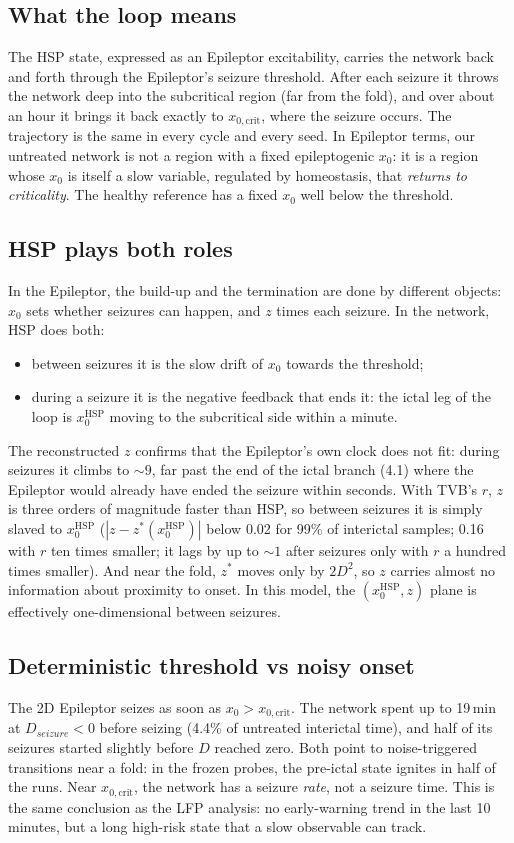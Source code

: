 \documentclass[11pt]{article}
\newcommand{\xc}{x_{0,\mathrm{crit}}}
\newcommand{\xh}{x_0^{\mathrm{HSP}}}
\begin{document}
\subsection{What the loop means}
The HSP state, expressed as an Epileptor excitability, carries the network back and forth through the Epileptor's
seizure threshold. After each seizure it throws the network deep into the subcritical region (far from the fold), and
over about an hour it brings it back exactly to $\xc$, where the seizure occurs. The trajectory is the same in every
cycle and every seed. In Epileptor terms, our untreated network is not a region with a fixed epileptogenic $x_0$:
it is a region whose $x_0$ is itself a slow variable, regulated by homeostasis, that \emph{returns to criticality}. The
healthy reference has a fixed $x_0$ well below the threshold.

\subsection{HSP plays both roles}
In the Epileptor, the build-up and the termination are done by different objects: $x_0$ sets whether seizures can
happen, and $z$ times each seizure. In the network, HSP does both:
\begin{itemize}
\item between seizures it is the slow drift of $x_0$ towards the threshold;
\item during a seizure it is the negative feedback that ends it: the ictal leg of the loop is $\xh$ moving to the
subcritical side within a minute.
\end{itemize}
The reconstructed $z$ confirms that the Epileptor's own clock does not fit: during seizures it climbs to $\sim9$, far
past the end of the ictal branch (4.1) where the Epileptor would already have ended the seizure within seconds. With
TVB's $r$, $z$ is three orders of magnitude faster than HSP, so between seizures it is simply slaved to $\xh$
($|z - z^*(\xh)|$ below 0.02 for 99\% of interictal samples; 0.16 with $r$ ten times smaller; it lags by up to $\sim1$
after seizures only with $r$ a hundred times smaller). And near the fold, $z^*$ moves only by $2D^2$, so $z$ carries
almost no information about proximity to onset. In this model, the $(\xh, z)$ plane is effectively one-dimensional
between seizures.

\subsection{Deterministic threshold vs noisy onset}
The 2D Epileptor seizes as soon as $x_0>\xc$. The network spent up to 19\,min at $D_{seizure}<0$ before seizing (4.4\%
of untreated interictal time), and half of its seizures started slightly before $D$ reached zero. Both point to
noise-triggered transitions near a fold: in the frozen probes, the pre-ictal state ignites in half of the runs.
Near $\xc$, the network has a seizure \emph{rate}, not a seizure time. This is the same conclusion as the LFP analysis:
no early-warning trend in the last 10 minutes, but a long high-risk state that a slow observable can track.
\end{document}
